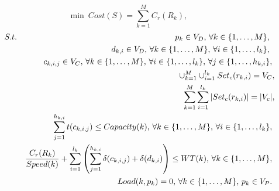 \documentclass[journal]{IEEEtran}
\begin{document}
\begin{figure}[h!]
\begin{equation}\label{eq:cost}
\min ~ Cost(S) = \sum_{k=1}^{M} C_r(R_k),
\end{equation}
\begin{eqnarray}
S.t. &&  p_{k}\in V_{D}\text{, } \forall k\in\{1,\dots, M\}\text{, }\nonumber\\
&& d_{k,i}\in V_{D}\text{, } \forall k\in\{1,\dots, M\}\text{, }\forall i\in\{1,\dots, l_k\}\text{, } \nonumber\\
&& c_{k,i,j}\in V_{C}\text{, } \forall k\in\{1,\dots, M\}\text{, } \forall i\in\{1,\dots, l_{k}\} \text{, } \forall j\in\{1,\dots, h_{k,i}\},\nonumber\\
&& \cup_{k=1}^{M} \cup_{i=1}^{l_{k}} Set_c(r_{k,i})=V_C, \hspace{-3pt}\label{eq:tasknb1}\\
&&\sum_{k=1}^M\sum_{i=1}^{l_k} |Set_c(r_{k,i})|=|V_c|, \hspace{-3pt}\label{eq:tasknb2}\\
 &&\sum_{j=1}^{h_{k,i}} t(c_{k,i,j}) \leq Capacity(k) \text{, }\forall k\in\{1,\dots, M\}\text{, } \forall i\in\{1,\dots, l_{k}\}, \label{eq:capacity} \\
&&\frac{C_r(R_k)}{Speed(k)} + \sum_{i=1}^{l_{k}} \left(\sum_{j=1}^{h_{k,i}} \delta(c_{k,i,j})+\delta(d_{k,i})\right)  \leq WT(k)\text{, }\forall k\in\{1,\dots, M\},\label{eq:time}\\
&& Load (k, p_k) = 0\text{, }\forall k\in \{1,\dots,M\}\text{, } p_k\in V_P.\label{eq:load}
\end{eqnarray}
\end{figure}

\end{document}
